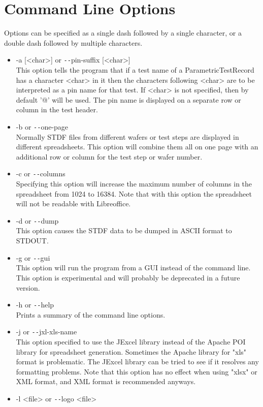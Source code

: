 \documentclass[letterpaper]{article}
\begin{document}
\section{Command Line Options}
Options can be specified as a single dash followed by a single character, or a double dash
followed by multiple characters.
\begin{itemize}
\item -a [<char>] or \texttt{-{}-}pin-suffix [<char>]\\
This option tells the program that if a test name of a ParametricTestRecord has
a character <char> in it then the characters following <char> are to be interpreted
as a pin name for that test.  If <char> is not specified, then by default '@' will be used.
The pin name is displayed on a separate row or column in the test header.
\item -b or \texttt{-{}-}one-page\\
Normally STDF files from different wafers or test steps are displayed in different spreadsheets.
This option will combine them all on one page with an additional row or column for the test
step or wafer number.
\item -c or \texttt{-{}-}columns\\
Specifying this option will increase the maximum number of columns in the spreadsheet
from 1024 to 16384.  Note that with this option the spreadsheet will not be
readable with Libreoffice.
\item -d or \texttt{-{}-}dump\\
This option causes the STDF data to be dumped in ASCII format to STDOUT.
\item -g or \texttt{-{}-}gui\\
This option will run the program from a GUI instead of the command line.  This option
is experimental and will probably be deprecated in a future version.
\item -h or \texttt{-{}-}help\\
Prints a summary of the command line options.
\item -j or \texttt{-{}-}jxl-xls-name\\
This option specified to use the JExcel library instead of the Apache POI library
for spreadsheet generation.  Sometimes the Apache library for "xls" format is problematic.
The JExcel library can be tried to see if it resolves any formatting problems.  Note
that this option has no effect when using "xlsx" or XML format, and XML format is
recommended anyways.
\item -l <file> or \texttt{-{}-}logo <file>\\

\end{itemize}
\end{document}

